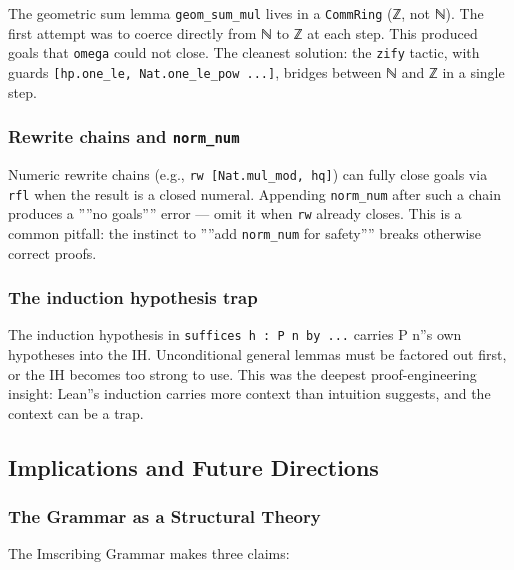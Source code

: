 \documentclass[12pt,a4paper]{article}
\begin{document}
The geometric sum lemma \texttt{geom\_sum\_mul} lives in a \texttt{CommRing} (ℤ, not ℕ). The first attempt was to coerce directly from ℕ to ℤ at each step. This produced goals that \texttt{omega} could not close. The cleanest solution: the \texttt{zify} tactic, with guards \texttt{{[}hp.one\_le, Nat.one\_le\_pow ...{]}}, bridges between ℕ and ℤ in a single step.

\subsubsection{Rewrite chains and \texttt{norm\_num}}

Numeric rewrite chains (e.g., \texttt{rw {[}Nat.mul\_mod, hq{]}}) can fully close goals via \texttt{rfl} when the result is a closed numeral. Appending \texttt{norm\_num} after such a chain produces a ''''no goals'''' error --- omit it when \texttt{rw} already closes. This is a common pitfall: the instinct to ''''add \texttt{norm\_num} for safety'''' breaks otherwise correct proofs.

\subsubsection{The induction hypothesis trap}

The induction hypothesis in \texttt{suffices h : P n by ...} carries P n''s own hypotheses into the IH. Unconditional general lemmas must be factored out first, or the IH becomes too strong to use. This was the deepest proof-engineering insight: Lean''s induction carries more context than intuition suggests, and the context can be a trap.

\subsection{Implications and Future Directions}

\subsubsection{The Grammar as a Structural Theory}

The Imscribing Grammar makes three claims:
\end{document}
